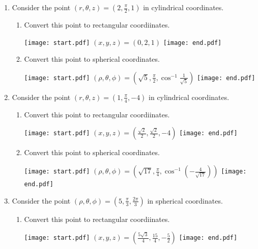 \documentclass[12pt]{article}
\begin{document}
\begin{enumerate}

\item Consider the point $(r,\theta,z)=\left(2, \frac{\pi}{2}, 1\right)$ in cylindrical coordinates.

\begin{enumerate}

\item Convert this point to rectangular coordiinates.

\texttt{[image: start.pdf]}
{{$(x,y,z)=(0,2,1)$}}
\texttt{[image: end.pdf]}


\item Convert this point to spherical coordinates.

\texttt{[image: start.pdf]}
{{$(\rho, \theta, \phi)=\left(\sqrt{5}, \frac{\pi}{2}, \cos^{-1}\frac{1}{\sqrt{5}}\right)$}}
\texttt{[image: end.pdf]}


\end{enumerate}

\item Consider the point $(r,\theta,z)=\left(1, \frac{\pi}{4}, -4\right)$ in cylindrical coordinates.

\begin{enumerate}

\item Convert this point to rectangular coordiinates.

\texttt{[image: start.pdf]}
{{$(x,y,z)=\left(\frac{\sqrt{2}}{2},\frac{\sqrt{2}}{2},-4\right)$}}
\texttt{[image: end.pdf]}


\item Convert this point to spherical coordinates.

\texttt{[image: start.pdf]}
{{$(\rho, \theta, \phi)=\left(\sqrt{17}, \frac{\pi}{4}, \cos^{-1}\left(-\frac{4}{\sqrt{17}}\right)\right)$}}
\texttt{[image: end.pdf]}


\end{enumerate}

\item Consider the point $(\rho,\theta,\phi)=\left(5, \frac{\pi}{3}, \frac{2\pi}{3}\right)$ in spherical coordinates.

\begin{enumerate}

\item Convert this point to rectangular coordiinates.

\texttt{[image: start.pdf]}
{{$(x,y,z)=\left(\frac{5\sqrt{3}}{4},\frac{15}{4},-\frac{5}{2}\right)$}}
\texttt{[image: end.pdf]}



\end{enumerate}
\end{enumerate}
\end{document}
